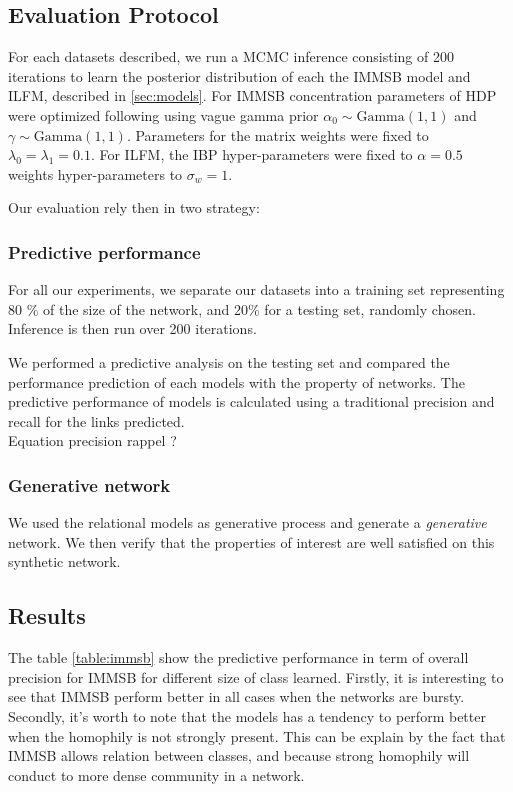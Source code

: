 \subsection{Evaluation Protocol}
For each datasets described,  we run a MCMC inference consisting of 200 iterations to learn the posterior distribution of each the IMMSB model and ILFM, described in \ref{sec:models}. For IMMSB concentration parameters of HDP were optimized following \cite{HDP} using vague gamma prior $\alpha_0 \sim \text{Gamma}(1,1)$ and $\gamma \sim \text{Gamma}(1,1)$. Parameters for the matrix weights were fixed to $\lambda_0=\lambda_1=0.1$. For ILFM, the IBP hyper-parameters were fixed to $\alpha=0.5$ weights hyper-parameters to $\sigma_w = 1$.

Our evaluation rely then in two strategy:



\subsubsection{Predictive performance}
For all our experiments, we separate our datasets into a training set representing 80 \% of the size of the network, and 20\% for a testing set, randomly chosen. Inference is then run over 200 iterations. 

We performed a predictive analysis on the testing set and compared the performance prediction of each models with the property of networks. 
The predictive performance of models is calculated using a traditional precision and recall for the links predicted.\\
Equation precision rappel ?

\subsubsection{Generative network}
We used the relational models as generative process and generate a \emph{generative} network. We then verify that the properties of interest are well satisfied on this synthetic network.


\subsection{Results}
The table \ref{table:immsb} show the predictive performance in term of overall precision for IMMSB for different size of class learned. Firstly, it is interesting to see that IMMSB perform better in all cases when the networks are bursty. Secondly, it's worth to note that the models has a tendency to perform better when the homophily is not strongly present. This can be explain by the fact that IMMSB allows relation between classes, and because strong homophily will conduct to more dense community in a network.


